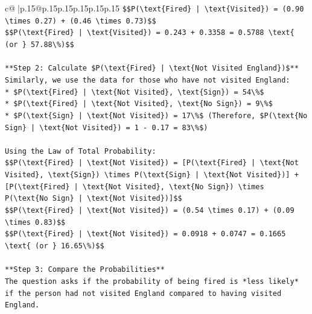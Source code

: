 \documentclass{article}
\begin{document}
{\begin{supertabular}{c@{$\;$}|p{.15\linewidth}@{}p{.15\linewidth}p{.15\linewidth}p{.15\linewidth}p{.15\linewidth}p{.15\linewidth}}
{{{\texttt{\$\$P(\textbackslash{}text\{Fired\} | \textbackslash{}text\{Visited\}) = (0.90 \textbackslash{}times 0.27) + (0.46 \textbackslash{}times 0.73)\$\$} \\
\texttt{\$\$P(\textbackslash{}text\{Fired\} | \textbackslash{}text\{Visited\}) = 0.243 + 0.3358 = 0.5788 \textbackslash{}text\{ (or \} 57.88\textbackslash{}\%)\$\$} \\
\\ 
\texttt{**Step 2: Calculate \$P(\textbackslash{}text\{Fired\} | \textbackslash{}text\{Not Visited England\})\$**} \\
\texttt{Similarly, we use the data for those who have not visited England:} \\
\texttt{*   \$P(\textbackslash{}text\{Fired\} | \textbackslash{}text\{Not Visited\}, \textbackslash{}text\{Sign\}) = 54\textbackslash{}\%\$} \\
\texttt{*   \$P(\textbackslash{}text\{Fired\} | \textbackslash{}text\{Not Visited\}, \textbackslash{}text\{No Sign\}) = 9\textbackslash{}\%\$} \\
\texttt{*   \$P(\textbackslash{}text\{Sign\} | \textbackslash{}text\{Not Visited\}) = 17\textbackslash{}\%\$ (Therefore, \$P(\textbackslash{}text\{No Sign\} | \textbackslash{}text\{Not Visited\}) = 1 {-} 0.17 = 83\textbackslash{}\%\$)} \\
\\ 
\texttt{Using the Law of Total Probability:} \\
\texttt{\$\$P(\textbackslash{}text\{Fired\} | \textbackslash{}text\{Not Visited\}) = {[}P(\textbackslash{}text\{Fired\} | \textbackslash{}text\{Not Visited\}, \textbackslash{}text\{Sign\}) \textbackslash{}times P(\textbackslash{}text\{Sign\} | \textbackslash{}text\{Not Visited\}){]} + {[}P(\textbackslash{}text\{Fired\} | \textbackslash{}text\{Not Visited\}, \textbackslash{}text\{No Sign\}) \textbackslash{}times P(\textbackslash{}text\{No Sign\} | \textbackslash{}text\{Not Visited\}){]}\$\$} \\
\texttt{\$\$P(\textbackslash{}text\{Fired\} | \textbackslash{}text\{Not Visited\}) = (0.54 \textbackslash{}times 0.17) + (0.09 \textbackslash{}times 0.83)\$\$} \\
\texttt{\$\$P(\textbackslash{}text\{Fired\} | \textbackslash{}text\{Not Visited\}) = 0.0918 + 0.0747 = 0.1665 \textbackslash{}text\{ (or \} 16.65\textbackslash{}\%)\$\$} \\
\\ 
\texttt{**Step 3: Compare the Probabilities**} \\
\texttt{The question asks if the probability of being fired is *less likely* if the person had not visited England compared to having visited England.} \\
}}}
\end{supertabular}}
\end{document}
